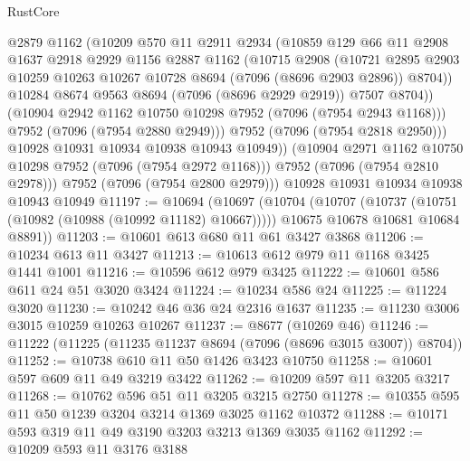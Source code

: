 \begin{lexlean}{RustCore}
\begin{coremodule}
                @2879
                @1162
                (@10209
                  @570
                  @11
                  @2911
                  @2934
                  (@10859
                    @129
                    @66
                    @11
                    @2908
                    @1637
                    @2918
                    @2929
                    @1156
                    @2887
                    @1162
                    (@10715
                      @2908
                      (@10721
                        @2895
                        @2903
                        @10259
                        @10263
                        @10267
                        @10728
                        @8694
                        (@7096 (@8696 @2903 @2896))
                        @8704))
                    @10284
                    @8674
                    @9563
                    @8694
                    (@7096 (@8696 @2929 @2919))
                    @7507
                    @8704))
                (@10904 @2942 @1162 @10750 @10298 @7952 (@7096 (@7954 @2943 @1168)))
                @7952
                (@7096 (@7954 @2880 @2949)))
              @7952
              (@7096 (@7954 @2818 @2950)))
            @10928
            @10931
            @10934
            @10938
            @10943
            @10949))
        (@10904 @2971 @1162 @10750 @10298 @7952 (@7096 (@7954 @2972 @1168)))
        @7952
        (@7096 (@7954 @2810 @2978)))
      @7952
      (@7096 (@7954 @2800 @2979)))
    @10928
    @10931
    @10934
    @10938
    @10943
    @10949
@11197 := @10694
    (@10697
      (@10704
        (@10707 (@10737 (@10751 (@10982 (@10988 (@10992 @11182) @10667)))))
        @10675
        @10678
        @10681
        @10684
        @8891))
@11203 := @10601 @613 @680 @11 @61 @3427 @3868
@11206 := @10234 @613 @11 @3427
@11213 := @10613 @612 @979 @11 @1168 @3425 @1441 @1001
@11216 := @10596 @612 @979 @3425
@11222 := @10601 @586 @611 @24 @51 @3020 @3424
@11224 := @10234 @586 @24
@11225 := @11224 @3020
@11230 := @10242 @46 @36 @24 @2316 @1637
@11235 := @11230 @3006 @3015 @10259 @10263 @10267
@11237 := @8677 (@10269 @46)
@11246 := @11222 (@11225 (@11235 @11237 @8694 (@7096 (@8696 @3015 @3007)) @8704))
@11252 := @10738 @610 @11 @50 @1426 @3423 @10750
@11258 := @10601 @597 @609 @11 @49 @3219 @3422
@11262 := @10209 @597 @11 @3205 @3217
@11268 := @10762 @596 @51 @11 @3205 @3215 @2750
@11278 := @10355 @595 @11 @50 @1239 @3204 @3214 @1369 @3025 @1162 @10372
@11288 := @10171 @593 @319 @11 @49 @3190 @3203 @3213 @1369 @3035 @1162
@11292 := @10209 @593 @11 @3176 @3188

\end{coremodule}
\end{lexlean}
